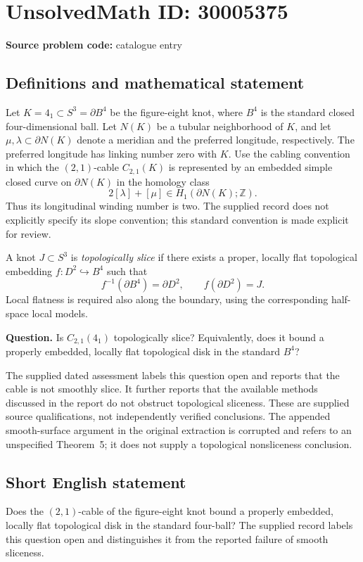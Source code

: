 \documentclass[11pt]{article}
\newcommand{\Z}{\mathbb{Z}}
\begin{document}
\section*{UnsolvedMath ID: 30005375}
\textbf{Source problem code:} catalogue entry
\subsection{Definitions and mathematical statement}
Let \(K=4_1\subset S^3=\partial B^4\) be the figure-eight knot, where \(B^4\) is the standard closed four-dimensional ball. Let \(N(K)\) be a tubular neighborhood of \(K\), and let \(\mu,\lambda\subset\partial N(K)\) denote a meridian and the preferred longitude, respectively. The preferred longitude has linking number zero with \(K\). Use the cabling convention in which the \((2,1)\)-cable \(C_{2,1}(K)\) is represented by an embedded simple closed curve on \(\partial N(K)\) in the homology class
\[
2[\lambda]+[\mu]\in H_1(\partial N(K);\Z).
\]
Thus its longitudinal winding number is two. The supplied record does not explicitly specify its slope convention; this standard convention is made explicit for review.

A knot \(J\subset S^3\) is \emph{topologically slice} if there exists a proper, locally flat topological embedding \(f:D^2\hookrightarrow B^4\) such that
\[
f^{-1}(\partial B^4)=\partial D^2,
\qquad f(\partial D^2)=J.
\]
Local flatness is required also along the boundary, using the corresponding half-space local models.

\textbf{Question.} Is \(C_{2,1}(4_1)\) topologically slice? Equivalently, does it bound a properly embedded, locally flat topological disk in the standard \(B^4\)?

The supplied dated assessment labels this question open and reports that the cable is not smoothly slice. It further reports that the available methods discussed in the report do not obstruct topological sliceness. These are supplied source qualifications, not independently verified conclusions. The appended smooth-surface argument in the original extraction is corrupted and refers to an unspecified Theorem~5; it does not supply a topological nonsliceness conclusion.
\subsection{Short English statement}
Does the \((2,1)\)-cable of the figure-eight knot bound a properly embedded, locally flat topological disk in the standard four-ball? The supplied record labels this question open and distinguishes it from the reported failure of smooth sliceness.
\end{document}
